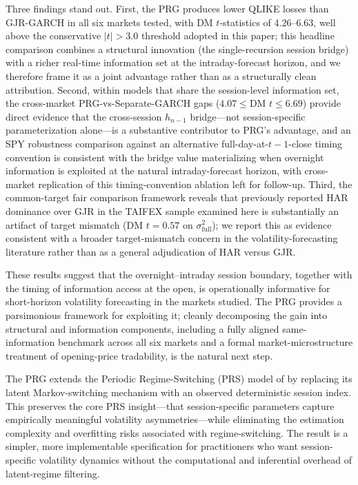 \documentclass[11pt,a4paper]{article}
\begin{document}
Three findings stand out. First, the PRG produces lower QLIKE losses than GJR-GARCH in all six markets tested, with DM $t$-statistics of 4.26--6.63, well above the conservative $|t|>3.0$ threshold adopted in this paper; this headline comparison combines a structural innovation (the single-recursion session bridge) with a richer real-time information set at the intraday-forecast horizon, and we therefore frame it as a joint advantage rather than as a structurally clean attribution. Second, within models that share the session-level information set, the cross-market PRG-vs-Separate-GARCH gaps ($4.07 \leq \text{DM } t \leq 6.69$) provide direct evidence that the cross-session $h_{n-1}$ bridge---not session-specific parameterization alone---is a substantive contributor to PRG's advantage, and an SPY robustness comparison against an alternative full-day-at-$t{-}1$-close timing convention is consistent with the bridge value materializing when overnight information is exploited at the natural intraday-forecast horizon, with cross-market replication of this timing-convention ablation left for follow-up. Third, the common-target fair comparison framework reveals that previously reported HAR dominance over GJR in the TAIFEX sample examined here is substantially an artifact of target mismatch (DM $t = 0.57$ on $\sigma^2_{\text{full}}$); we report this as evidence consistent with a broader target-mismatch concern in the volatility-forecasting literature rather than as a general adjudication of HAR versus GJR.

These results suggest that the overnight--intraday session boundary, together with the timing of information access at the open, is operationally informative for short-horizon volatility forecasting in the markets studied. The PRG provides a parsimonious framework for exploiting it; cleanly decomposing the gain into structural and information components, including a fully aligned same-information benchmark across all six markets and a formal market-microstructure treatment of opening-price tradability, is the natural next step.

The PRG extends the Periodic Regime-Switching (PRS) model of \citet{Lai2024} by replacing its latent Markov-switching mechanism with an observed deterministic session index. This preserves the core PRS insight---that session-specific parameters capture empirically meaningful volatility asymmetries---while eliminating the estimation complexity and overfitting risks associated with regime-switching. The result is a simpler, more implementable specification for practitioners who want session-specific volatility dynamics without the computational and inferential overhead of latent-regime filtering.
\end{document}
